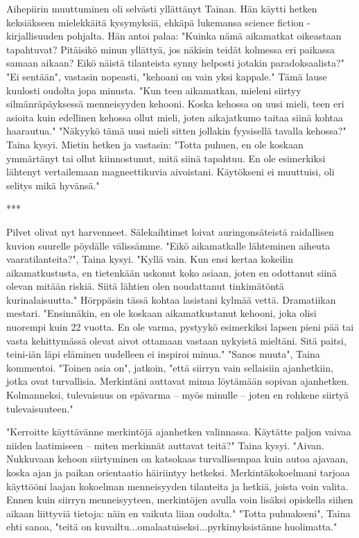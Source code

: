﻿\documentclass[a4paper, 12pt, finnish]{article}
\begin{document}
Aihepiirin muuttuminen oli selvästi yllättänyt Tainan.
Hän käytti hetken keksiäkseen mielekkäitä kysymyksiä, ehkäpä
lukemansa science fiction -kirjallisuuden pohjalta. Hän antoi palaa: 
"Kuinka nämä aikamatkat oikeastaan tapahtuvat? Pitäisikö minun yllättyä, jos
näkisin teidät kolmessa eri paikassa samaan aikaan? Eikö näistä tilanteista synny
helposti jotakin paradoksaalista?"
"Ei sentään", vastasin nopeasti, "kehoani on vain yksi kappale."
Tämä lause kuulosti oudolta jopa minusta.
"Kun teen aikamatkan,
mieleni siirtyy silmänräpäyksessä menneisyyden kehooni. Koska kehossa on
uusi mieli, teen eri asioita kuin edellinen kehossa ollut mieli,
joten aikajatkumo taitaa siinä kohtaa haarautua."
"Näkyykö tämä uusi mieli sitten jollakin fyysisellä tavalla kehossa?" Taina kysyi.
Mietin hetken ja vastasin: "Totta puhuen, en ole koskaan ymmärtänyt
tai ollut kiinnostunut, mitä siinä tapahtuu. En ole esimerkiksi
lähtenyt vertailemaan magneettikuvia aivoistani. Käytökseni ei
muuttuisi, oli selitys mikä hyvänsä."

***

Pilvet olivat nyt harvenneet. Sälekaihtimet loivat auringonsäteistä
raidallisen kuvion suurelle pöydälle välissämme.
"Eikö aikamatkalle lähteminen aiheuta vaaratilanteita?", Taina kysyi.
"Kyllä vain. Kun ensi kertaa kokeilin aikamatkustusta, en tietenkään uskonut
koko asiaan, joten en odottanut siinä olevan mitään riskiä. Siitä lähtien
olen noudattanut tinkimätöntä kurinalaisuutta."
Hörppäsin tässä kohtaa lasistani kylmää vettä. Dramatiikan mestari.
"Ensinnäkin, en ole koskaan
aikamatkustanut kehooni, joka olisi nuorempi kuin 22 vuotta.
En ole varma, pystyykö esimerkiksi lapsen pieni pää tai
vasta kehittymässä olevat aivot ottamaan vastaan nykyistä mieltäni.
Sitä paitsi, teini-iän läpi eläminen uudelleen ei inspiroi minua."
"Sanos muuta", Taina kommentoi.
"Toinen asia on", jatkoin, "että siirryn vain sellaisiin
ajanhetkiin, jotka ovat turvallisia. Merkintäni auttavat minua
löytämään sopivan ajanhetken. Kolmanneksi, tulevaisuus on
epävarma -- myös minulle -- joten
en rohkene siirtyä tulevaisuuteen." 

"Kerroitte käyttävänne merkintöjä ajanhetken valinnassa.
Käytätte paljon vaivaa niiden laatimiseen -- miten merkinnät
auttavat teitä?" Taina kysyi.
"Aivan. Nukkuvaan kehoon siirtyminen
on katsokaas turvallisempaa kuin autoa ajavaan, koska ajan ja paikan
orientaatio häiriintyy hetkeksi. Merkintäkokoelmani tarjoaa
käyttööni laajan kokoelman menneisyyden tilanteita
ja hetkiä, joista voin valita.
Ennen kuin siirryn menneisyyteen, merkintöjen avulla voin lisäksi opiskella
siihen aikaan liittyviä tietoja: näin en vaikuta liian oudolta."
"Totta puhuakseni", Taina ehti sanoa, "teitä on
kuvailtu...omalaatuiseksi...pyrkimyksistänne huolimatta."
\end{document}
